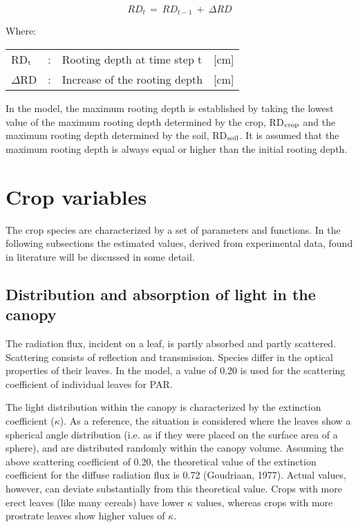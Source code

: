 \begin{equation}
RD _{t~} =~RD _{t-1} ~+~\Delta RD
\end{equation}

Where:\\[5pt]
\begin{tabularx}{\textwidth}{llXr}
	RD$_{{\rm t}}$ &:& Rooting depth at time step t   &  [cm]\\
	$\Delta$RD &:& Increase of the rooting depth    & [cm]\\
\end{tabularx}

In the model, the maximum rooting depth is established by taking the lowest value of the
maximum rooting depth determined by the crop, RD$_{{\rm crop}}$ and the maximum rooting depth
determined by the soil, RD$_{{\rm soil}}$. It is assumed that the maximum rooting depth is 
always equal or higher than the initial rooting depth.


\section{Crop variables}

The crop species are characterized by a set of parameters and functions. In the following subsections the estimated values, derived from experimental data, found in literature will be discussed in some detail.

\subsection{Distribution and absorption of light in the canopy} 

The radiation flux, incident on a leaf, is partly absorbed and partly scattered. Scattering consists of reflection and transmission. Species differ in the optical properties of their leaves. In the model, a value of 0.20 is used for the scattering coefficient of individual leaves for PAR.

The light distribution within the canopy is characterized by the extinction coefficient ($\kappa$). As a reference, the situation is considered where the leaves show a spherical angle distribution (i.e. as if they were placed on the surface area of a sphere), and are distributed randomly within the canopy volume. Assuming the above scattering coefficient of 0.20, the theoretical value of the extinction coefficient for the diffuse radiation flux is 0.72 (Goudriaan, 1977). Actual values, however, can deviate substantially from this theoretical value. Crops with more erect leaves (like many cereals) have lower $\kappa$ values, whereas crops with more prostrate leaves show higher values of $\kappa$. 

